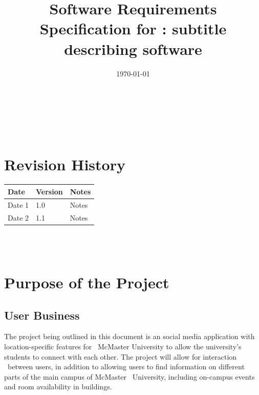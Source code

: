 \documentclass[12pt]{article}
\begin{document}
\title{Software Requirements Specification for \progname: subtitle describing software} 
\author{\authname}
\date{\today}
	
\maketitle

~\newpage


\tableofcontents

~\newpage

\section*{Revision History}

\begin{tabularx}{\textwidth}{p{3cm}p{2cm}X}
\toprule {\textbf{Date}} & {\textbf{Version}} & {\textbf{Notes}}\\
\midrule
Date 1 & 1.0 & Notes\\
Date 2 & 1.1 & Notes\\
\bottomrule
\end{tabularx}

~\\

~\newpage
\section{Purpose of the Project}
\subsection{User Business}
\quad The project being outlined in this document is an social media application with location-specific features for \
McMaster University to allow the university's students to connect with each other. The project will allow for interaction \
between users, in addition to allowing users to find information on different parts of the main campus of McMaster \
University, including on-campus events and room availability in buildings.
\end{document}

